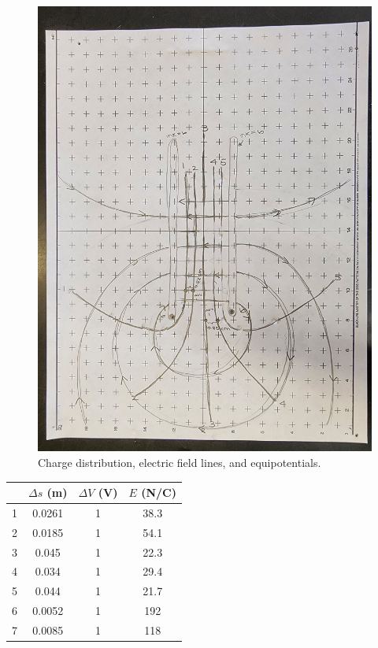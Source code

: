 \documentclass[12pt]{article}
\begin{document}
        \begin{figure}[H]
            \centering
            \includegraphics[width=0.8\linewidth]{Erin's Lines.jpg}
            \caption{Charge distribution, electric field lines, and equipotentials.}
        \end{figure}
        \begin{table}[H]
            \centering
            \begin{tabular}{c|c|c|c}
               & \(\Delta s\) (m) & \(\Delta V\) (V) & \(E\) (N/C)\\
               \hline
               1 & 0.0261 & 1 & 38.3\\
               2 & 0.0185 & 1 & 54.1\\
               3 & 0.045 & 1 & 22.3\\
               4 & 0.034 & 1 & 29.4\\
               5 & 0.044 & 1 & 21.7\\
               6 & 0.0052 & 1 & 192\\
               7 & 0.0085 & 1 & 118
            \end{tabular}
        \end{table}
\end{document}
